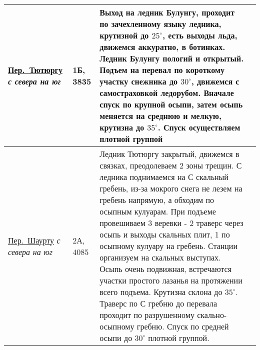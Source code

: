 \begin{longtable}{|>{\centering\arraybackslash}m{4.5cm}|>{\centering\arraybackslash}m{1.8cm}|>{\raggedright\arraybackslash}m{9.6cm}|>{\centering\arraybackslash}m{1.2cm}|}
			\hyperref[subsec:Day12]{{\small Пер.~Тютюргу}}																	\newline\textit{с севера на юг}			&	1Б, 3835					&	{\small Выход на ледник Булунгу, проходит по зачехленному языку ледника, крутизной до $25^\circ$, есть выходы льда, движемся аккуратно, в ботинках. Ледник Булунгу пологий и открытый. Подъем на перевал по короткому участку снежника до $30^\circ$, движемся с самостраховкой ледорубом. Вначале спуск по крупной осыпи, затем осыпь меняется на среднюю и мелкую, крутизна до $35^\circ$. Спуск осуществляем плотной группой}																																																																																																																																																																																																																																								&			\\ \hline
			\hyperref[subsec:Day12]{{\small Пер.~Шаурту}}																	\newline\textit{с севера на юг}			&	2А,	4085					&	{\small Ледник Тютюргу закрытый, движемся в связках, преодолеваем 2 зоны трещин. С ледника поднимаемся на С скальный гребень, из-за мокрого снега не лезем на гребень напрямую, а обходим по осыпным кулуарам. При подъеме провешиваем 3 веревки - 2 траверс через осыпь и выходы скальных плит, 1 по осыпному кулуару на гребень. Станции организуем на скальных выступах. Осыпь очень подвижная, встречаются участки простого лазанья на протяжении всего подъема. Крутизна склона до $35^\circ$. Траверс по С гребню до перевала проходит по разрушенному скально-осыпному гребню. Спуск по средней осыпи до $30^\circ$ плотной группой.}																																																																																																																																																																																					&			\\ \hline

\end{longtable}
